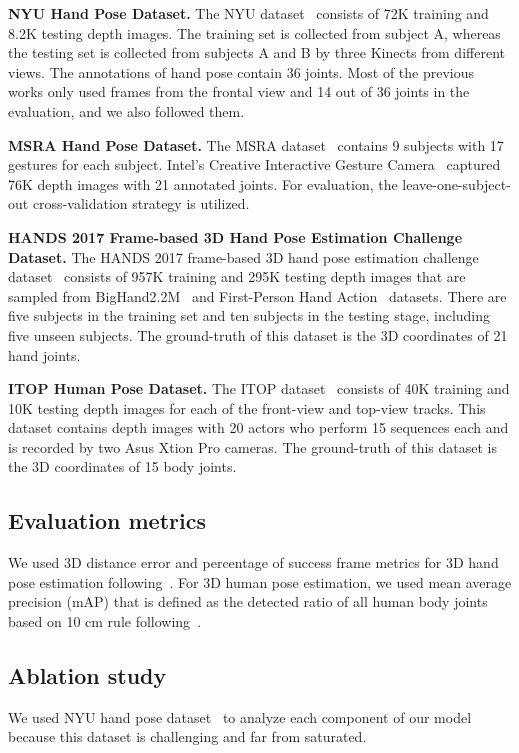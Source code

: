 \documentclass[10pt,twocolumn,letterpaper]{article}
\begin{document}
{\bf NYU Hand Pose Dataset.}
The NYU dataset~\cite{tompson2014real} consists of 72K training and 8.2K testing depth images. The training set is collected from subject A, whereas the testing set is collected from subjects A and B by three Kinects from different views. The annotations of hand pose contain 36 joints. Most of the previous works only used frames from the frontal view and 14 out of 36 joints in the evaluation, and we also followed them.

{\bf MSRA Hand Pose Dataset.}
The MSRA dataset~\cite{sun2015cascaded} contains 9 subjects with 17 gestures for each subject. Intel's Creative Interactive Gesture Camera~\cite{melax2013dynamics} captured 76K depth images with 21 annotated joints. For evaluation, the leave-one-subject-out cross-validation strategy is utilized. 

{\bf HANDS 2017 Frame-based 3D Hand Pose Estimation Challenge Dataset.}
The HANDS 2017 frame-based 3D hand pose estimation challenge dataset~\cite{yuan20172017} consists of 957K training and 295K testing depth images that are sampled from BigHand2.2M~\cite{Yuan_2017_CVPR} and First-Person Hand Action~\cite{garcia2017first} datasets. There are five subjects in the training set and ten subjects in the testing stage, including five unseen subjects. The ground-truth of this dataset is the 3D coordinates of 21 hand joints.

{\bf ITOP Human Pose Dataset.}
The ITOP dataset~\cite{haque2016towards} consists of 40K training and 10K testing depth images for each of the front-view and top-view tracks. This dataset contains depth images with 20 actors who perform 15 sequences each and is recorded by two Asus Xtion Pro cameras. The ground-truth of this dataset is the 3D coordinates of 15 body joints.


\subsection{Evaluation metrics}

We used 3D distance error and percentage of success frame metrics for 3D hand pose estimation following~\cite{tang2014latent,sun2015cascaded}. For 3D human pose estimation, we used mean average precision (mAP) that is defined as the detected ratio of all human body joints based on 10 cm rule following~\cite{haque2016towards,yub2015random}.

\subsection{Ablation study}
We used NYU hand pose dataset~\cite{tompson2014real} to analyze each component of our model because this dataset is challenging and far from saturated.
\end{document}
